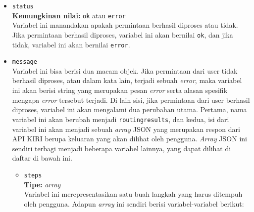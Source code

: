 \documentclass[a4paper,twoside]{article}
\begin{document}
\begin{enumerate}
\begin{itemize}
	\item \verb|status|\\
	\textbf{Kemungkinan nilai:} \verb|ok| atau \verb|error|\\
	Variabel ini manandakan apakah permintaan berhasil diproses atau tidak. Jika permintaan \mbox{berhasil} diproses, variabel ini akan bernilai \verb|ok|, dan jika tidak, variabel ini akan bernilai \verb|error|.
	\item \verb|message|\\
	Variabel ini bisa berisi dua macam objek. Jika permintaan dari user tidak berhasil diproses, atau dalam kata lain, terjadi sebuah \textit{error}, maka variabel ini akan berisi string yang merupakan pesan \textit{error} serta alasan spesifik mengapa \textit{error} tersebut terjadi. Di lain sisi, jika permintaan dari user berhasil diproses, variabel ini akan mengalami dua perubahan utama. Pertama, nama variabel ini akan berubah menjadi \verb|routingresults|, dan kedua, isi dari variabel ini akan menjadi sebuah \textit{array} JSON yang merupakan respon dari API KIRI berupa keluaran yang akan dilihat oleh pengguna. \textit{Array} JSON ini sendiri terbagi menjadi beberapa variabel lainnya, yang dapat dilihat di daftar di bawah ini.
	
	\begin{itemize}
		\item \verb|steps|\\
		\textbf{Tipe:} \textit{array}\\
		Variabel ini merepresentasikan satu buah langkah yang harus ditempuh oleh pengguna. Adapun \textit{array} ini sendiri berisi variabel-variabel berikut:
		

\end{itemize}
\end{itemize}
\end{enumerate}
\end{document}
